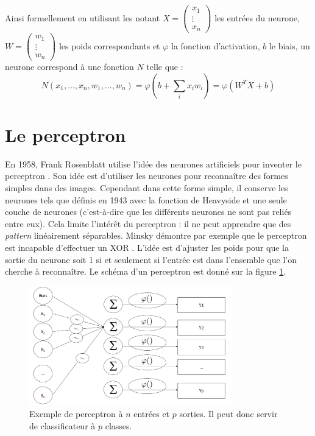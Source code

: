 Ainsi formellement en utilisant les notant $X = \begin{pmatrix} x_1\\ \vdots \\ x_n \end{pmatrix}$  les entrées du neurone, $W = \begin{pmatrix} w_1\\ \vdots \\ w_n \end{pmatrix}$ les poids correspondants et $\varphi$ la fonction d'activation, $b$ le biais, un neurone correspond à une fonction $N$ telle que : $$N(x_1,...,x_n,w_1,...,w_n) = \varphi(b+ \sum\limits_{i} x_i w_i) = \varphi(W^T  X+b)$$



\section{Le perceptron}
En 1958, Frank Rosenblatt utilise l'idée des neurones artificiels pour inventer le perceptron \cite{rosenblatt_perceptron_1958}. Son idée est d'utiliser les neurones pour reconnaître des formes simples dans des images. Cependant dans cette forme simple, il conserve les neurones tels que définis en 1943 avec la fonction de Heavyside et une seule couche de neurones (c'est-à-dire que les différents neurones ne sont pas reliés entre eux). Cela limite l'intérêt du perceptron : il ne peut apprendre que des \textit{pattern} linéairement séparables. Minsky démontre par exemple que le perceptron est incapable d'effectuer un XOR \cite{minsky_perceptrons_2017}. L'idée est d'ajuster les poids pour que la sortie du neurone soit 1 si et seulement si l'entrée est dans l'ensemble que l'on cherche à reconnaître. Le schéma d'un perceptron est donné sur la figure \ref{perceptron}.

\begin{figure}[!h]
\centering
\includegraphics[width=250pt,valign=t]{"images/MLP/perceptron"}
\caption{Exemple de perceptron à $n$ entrées et $p$ sorties. Il peut donc servir de classificateur à $p$ classes.}
\label{perceptron}
\end{figure}

